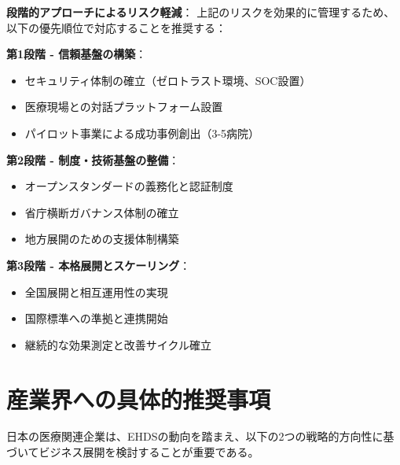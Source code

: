 \documentclass[
  a4paper,
  a4paper,
  11pt]{ltjsbook}
\providecommand{\tightlist}{%
  \setlength{\itemsep}{0pt}\setlength{\parskip}{0pt}}
\begin{document}
\begin{tcolorbox}[enhanced jigsaw, toprule=.15mm, bottomtitle=1mm, coltitle=black, left=2mm, opacityback=0, arc=.35mm, colbacktitle=quarto-callout-note-color!10!white, colback=white, opacitybacktitle=0.6, bottomrule=.15mm, rightrule=.15mm, breakable, title=\textcolor{quarto-callout-note-color}{\faInfo}\hspace{0.5em}{Note}, toptitle=1mm, titlerule=0mm, colframe=quarto-callout-note-color-frame, leftrule=.75mm]

\textbf{段階的アプローチによるリスク軽減}：
上記のリスクを効果的に管理するため、以下の優先順位で対応することを推奨する：

\textbf{第1段階 - 信頼基盤の構築}：

\begin{itemize}
\tightlist
\item
  セキュリティ体制の確立（ゼロトラスト環境、SOC設置）
\item
  医療現場との対話プラットフォーム設置
\item
  パイロット事業による成功事例創出（3-5病院）
\end{itemize}

\textbf{第2段階 - 制度・技術基盤の整備}：

\begin{itemize}
\tightlist
\item
  オープンスタンダードの義務化と認証制度
\item
  省庁横断ガバナンス体制の確立
\item
  地方展開のための支援体制構築
\end{itemize}

\textbf{第3段階 - 本格展開とスケーリング}：

\begin{itemize}
\tightlist
\item
  全国展開と相互運用性の実現
\item
  国際標準への準拠と連携開始
\item
  継続的な効果測定と改善サイクル確立
\end{itemize}

\end{tcolorbox}

\section{産業界への具体的推奨事項}\label{ux7523ux696dux754cux3078ux306eux5177ux4f53ux7684ux63a8ux5968ux4e8bux9805}

日本の医療関連企業は、EHDSの動向を踏まえ、以下の2つの戦略的方向性に基づいてビジネス展開を検討することが重要である。
\end{document}
